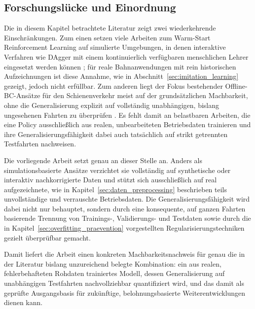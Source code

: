 \subsection{Forschungslücke und Einordnung}
\label{sec:forschungsluecke}

Die in diesem Kapitel betrachtete Literatur zeigt zwei wiederkehrende Einschränkungen. Zum einen setzen viele Arbeiten zum Warm-Start Reinforcement Learning auf simulierte Umgebungen, in denen interaktive Verfahren wie \gls{DAgger} mit einem kontinuierlich verfügbaren menschlichen Lehrer eingesetzt werden können \cite[S.~1]{chap3_Cha21}; für reale Bahnanwendungen mit rein historischen Aufzeichnungen ist diese Annahme, wie in Abschnitt~\ref{sec:imitation_learning} gezeigt, jedoch nicht erfüllbar. Zum anderen liegt der Fokus bestehender Offline-\gls{BC}-Ansätze für den Schienenverkehr meist auf der grundsätzlichen Machbarkeit, ohne die Generalisierung explizit auf vollständig unabhängigen, bislang ungesehenen Fahrten zu überprüfen \cite[vgl.][]{chap3_Sha24, chap3_Liu19}. Es fehlt damit an belastbaren Arbeiten, die eine Policy ausschließlich aus realen, unbearbeiteten Betriebsdaten trainieren und ihre Generalisierungsfähigkeit dabei auch tatsächlich auf strikt getrennten Testfahrten nachweisen.

Die vorliegende Arbeit setzt genau an dieser Stelle an. Anders als simulationsbasierte Ansätze verzichtet sie vollständig auf synthetische oder interaktiv nachkorrigierte Daten und stützt sich ausschließlich auf real aufgezeichnete, wie in Kapitel~\ref{sec:daten_preprocessing} beschrieben teils unvollständige und verrauschte Betriebsdaten. Die Generalisierungsfähigkeit wird dabei nicht nur behauptet, sondern durch eine konsequente, auf ganzen Fahrten basierende Trennung von Trainings-, Validierungs- und Testdaten sowie durch die in Kapitel~\ref{sec:overfitting_praevention} vorgestellten Regularisierungstechniken gezielt überprüfbar gemacht.

Damit liefert die Arbeit einen konkreten Machbarkeitsnachweis für genau die in der Literatur bislang unzureichend belegte Kombination: ein aus realen, fehlerbehafteten Rohdaten trainiertes Modell, dessen Generalisierung auf unabhängigen Testfahrten nachvollziehbar quantifiziert wird, und das damit als geprüfte Ausgangsbasis für zukünftige, belohnungsbasierte Weiterentwicklungen dienen kann.